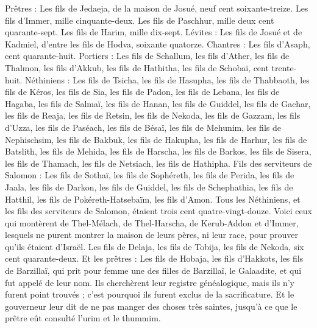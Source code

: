 \begin{multicols}{2}
Prêtres : Les fils de Jedaeja, de la maison de Josué, neuf cent soixante-treize.
Les fils d'Immer, mille cinquante-deux.
Les fils de Paschhur, mille deux cent quarante-sept.
Les fils de Harim, mille dix-sept.
Lévites : Les fils de Josué et de Kadmiel, d'entre les fils de Hodva, soixante quatorze.
Chantres : Les fils d'Asaph, cent quarante-huit.
Portiers : Les fils de Schallum, les fils d'Ather, les fils de Thalmon, les fils d'Akkub, les fils de Hathitha, les fils de Schobaï, cent trente-huit.
Néthiniens : Les fils de Tsicha, les fils de Hasupha, les fils de Thabbaoth,
les fils de Kéros, les fils de Sia, les fils de Padon,
les fils de Lebana, les fils de Hagaba, les fils de Salmaï,
les fils de Hanan, les fils de Guiddel, les fils de Gachar,
les fils de Reaja, les fils de Retsin, les fils de Nekoda,
les fils de Gazzam, les fils d'Uzza, les fils de Paséach,
les fils de Bésaï, les fils de Mehunim, les fils de Nephischsim,
les fils de Bakbuk, les fils de Hakupha, les fils de Harhur,
les fils de Batslith, les fils de Mehida, les fils de Harscha,
les fils de Barkos, les fils de Sisera, les fils de Thamach,
les fils de Netsiach, les fils de Hathipha.
Fils des serviteurs de Salomon : Les fils de Sothaï, les fils de Sophéreth, les fils de Perida,
les fils de Jaala, les fils de Darkon, les fils de Guiddel,
les fils de Schephathia, les fils de Hatthil, les fils de Pokéreth-Hatsebaïm, les fils d'Amon.
Tous les Néthiniens, et les fils des serviteurs de Salomon, étaient trois cent quatre-vingt-douze.
Voici ceux qui montèrent de Thel-Mélach, de Thel-Harscha, de Kerub-Addon et d'Immer, lesquels ne purent montrer la maison de leurs pères, ni leur race, pour prouver qu'ils étaient d'Israël.
Les fils de Delaja, les fils de Tobija, les fils de Nekoda, six cent quarante-deux.
Et les prêtres : Les fils de Hobaja, les fils d'Hakkots, les fils de Barzillaï, qui prit pour femme une des filles de Barzillaï, le Galaadite, et qui fut appelé de leur nom.
Ils cherchèrent leur registre généalogique, mais ils n'y furent point trouvés ; c'est pourquoi ils furent exclus de la sacrificature.
Et le gouverneur leur dit de ne pas manger des choses très saintes, jusqu'à ce que le prêtre eût consulté l'urim et le thummim.

\end{multicols}
